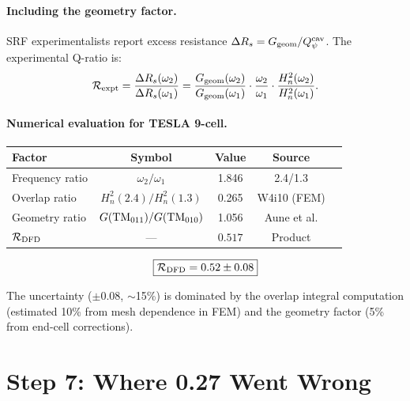 \documentclass[11pt]{article}
\newcommand{\Heff}{H_n}
\theoremstyle{definition}
\theoremstyle{remark}
\begin{document}
\paragraph{Including the geometry factor.}
SRF experimentalists report excess resistance
$\Delta R_s = G_{\rm geom}/Q_\psi^{\rm cav}$. The experimental
Q-ratio is:
\begin{equation}
\mathcal{R}_{\rm expt}
= \frac{\Delta R_s(\omega_2)}{\Delta R_s(\omega_1)}
= \frac{G_{\rm geom}(\omega_2)}{G_{\rm geom}(\omega_1)}
\cdot \frac{\omega_2}{\omega_1}
\cdot \frac{\Heff^2(\omega_2)}{\Heff^2(\omega_1)}.
\label{eq:R-expt}
\end{equation}

\paragraph{Numerical evaluation for TESLA 9-cell.}
\begin{center}
\begin{tabular}{@{}lcccc@{}}
\toprule
Factor & Symbol & Value & Source \\
\midrule
Frequency ratio & $\omega_2/\omega_1$ & 1.846 & 2.4/1.3 \\
Overlap ratio & $\Heff^2(2.4)/\Heff^2(1.3)$ & 0.265 & W4i10 (FEM) \\
Geometry ratio & $G({\rm TM}_{011})/G({\rm TM}_{010})$ & 1.056 & Aune et al. \\
\midrule
$\mathcal{R}_{\rm DFD}$ & --- & $\mathbf{0.517}$ & Product \\
\bottomrule
\end{tabular}
\end{center}

\begin{equation}
\boxed{
\mathcal{R}_{\rm DFD} = 0.52 \pm 0.08
}
\label{eq:R-final}
\end{equation}

The uncertainty ($\pm 0.08$, $\sim$15\%) is dominated by the overlap
integral computation (estimated 10\% from mesh dependence in FEM)
and the geometry factor (5\% from end-cell corrections).


\section{Step 7: Where 0.27 Went Wrong}
\label{sec:027-wrong}
\end{document}
